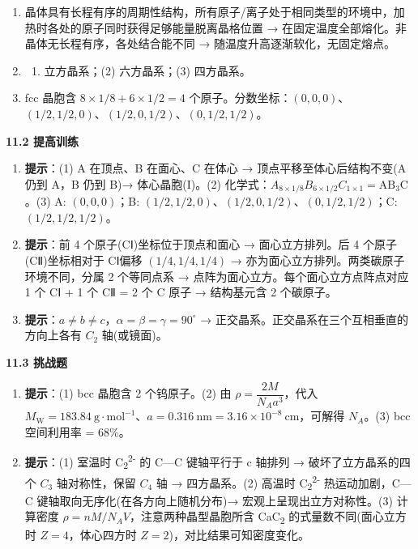 \begin{enumerate}
\def\labelenumi{\arabic{enumi}.}
\item
  晶体具有长程有序的周期性结构，所有原子/离子处于相同类型的环境中，加热时各处的原子同时获得足够能量脱离晶格位置 → 在固定温度全部熔化。非晶体无长程有序，各处结合能不同 → 随温度升高逐渐软化，无固定熔点。
\item
  \begin{enumerate}
  \def\labelenumii{(\arabic{enumii})}
  \tightlist
  \item
    立方晶系；(2) 六方晶系；(3) 四方晶系。
  \end{enumerate}
\item
  fcc 晶胞含 \(8 \times 1/8 + 6 \times 1/2 = 4\) 个原子。分数坐标：\((0, 0, 0)\)、\((1/2, 1/2, 0)\)、\((1/2, 0, 1/2)\)、\((0, 1/2, 1/2)\)。
\end{enumerate}

\textbf{11.2 提高训练}

\begin{enumerate}
\def\labelenumi{\arabic{enumi}.}
\setcounter{enumi}{3}
\item
  \textbf{提示}：(1) A 在顶点、B 在面心、C 在体心 → 顶点平移至体心后结构不变(A 仍到 A，B 仍到 B)→ 体心晶胞(I)。(2) 化学式：\(A_{8\times 1/8} B_{6\times 1/2} C_{1\times 1} = \mathrm{AB_3C}\)。(3) A: \((0,0,0)\)；B: \((1/2,1/2,0)\)、\((1/2,0,1/2)\)、\((0,1/2,1/2)\)；C: \((1/2,1/2,1/2)\)。
\item
  \textbf{提示}：前 4 个原子(CⅠ)坐标位于顶点和面心 → 面心立方排列。后 4 个原子(CⅡ)坐标相对于 CⅠ偏移 \((1/4, 1/4, 1/4)\) → 亦为面心立方排列。两类碳原子环境不同，分属 2 个等同点系 → 点阵为面心立方。每个面心立方点阵点对应 1 个 CⅠ + 1 个 CⅡ = 2 个 C 原子 → 结构基元含 2 个碳原子。
\item
  \textbf{提示}：\(a \neq b \neq c\)，\(\alpha = \beta = \gamma = 90^\circ\) → 正交晶系。正交晶系在三个互相垂直的方向上各有 \(C_2\) 轴(或镜面)。
\end{enumerate}

\textbf{11.3 挑战题}

\begin{enumerate}
\def\labelenumi{\arabic{enumi}.}
\setcounter{enumi}{6}
\item
  \textbf{提示}：(1) bcc 晶胞含 2 个钨原子。(2) 由 \(\rho = \dfrac{2M}{N_A a^3}\)，代入 \(M_{\mathrm{W}} = 183.84\ \mathrm{g\cdot mol^{-1}}\)、\(a = 0.316\ \mathrm{nm} = 3.16\times 10^{-8}\ \mathrm{cm}\)，可解得 \(N_A\)。(3) bcc 空间利用率 = 68\%。
\item
  \textbf{提示}：(1) 室温时 C\textsubscript{2}\textsuperscript{2-} 的 C---C 键轴平行于 c 轴排列 → 破坏了立方晶系的四个 \(C_3\) 轴对称性，保留 \(C_4\) 轴 → 四方晶系。(2) 高温时 C\textsubscript{2}\textsuperscript{2-} 热运动加剧，C---C 键轴取向无序化(在各方向上随机分布)→ 宏观上呈现出立方对称性。(3) 计算密度 \(\rho = nM/N_A V\)，注意两种晶型晶胞所含 CaC\textsubscript{2} 的式量数不同(面心立方时 \(Z = 4\)，体心四方时 \(Z = 2\))，对比结果可知密度变化。
\end{enumerate}

